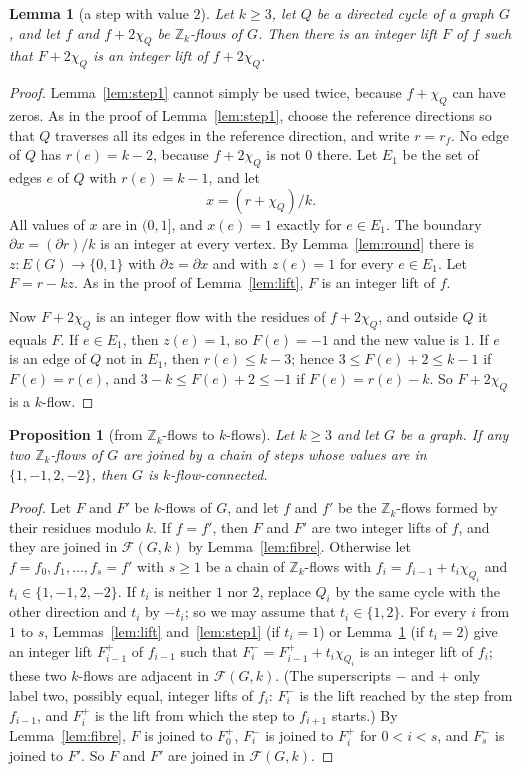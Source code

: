\documentclass[11pt]{article}
\newtheorem{lemma}[theorem]{Lemma}
\newtheorem{proposition}[theorem]{Proposition}
\theoremstyle{definition}
\newcommand{\Z}{\mathbb{Z}}
\newcommand{\cF}{\mathcal{F}}
\begin{document}
\begin{lemma}[a step with value $2$]\label{lem:step2}
Let $k\ge 3$, let $Q$ be a directed cycle of a graph $G$, and let $f$ and $f+2\chi_Q$ be $\Z_k$-flows of $G$. Then
there is an integer lift $F$ of $f$ such that $F+2\chi_Q$ is an integer lift of $f+2\chi_Q$.
\end{lemma}
\begin{proof}
Lemma~\ref{lem:step1} cannot simply be used twice, because $f+\chi_Q$ can have zeros. As in the proof of Lemma~\ref{lem:step1}, choose the reference directions so that $Q$ traverses all its edges in the reference
direction, and write $r=r_f$. No edge of $Q$ has $r(e)=k-2$, because $f+2\chi_Q$ is not $0$ there. Let $E_1$ be the set of edges $e$ of $Q$ with $r(e)=k-1$, and let
\[
x=(r+\chi_Q)/k .
\]
All values of $x$ are in $(0,1]$, and $x(e)=1$ exactly for $e\in E_1$. The boundary $\partial x=(\partial r)/k$ is
an integer at every vertex. By Lemma~\ref{lem:round} there is $z\colon E(G)\to\{0,1\}$ with $\partial z=\partial x$
and with $z(e)=1$ for every $e\in E_1$. Let $F=r-kz$. As in the proof of Lemma~\ref{lem:lift}, $F$ is an integer
lift of $f$.

Now $F+2\chi_Q$ is an integer flow with the residues of $f+2\chi_Q$, and outside $Q$ it equals $F$. If $e\in E_1$, then $z(e)=1$, so
$F(e)=-1$ and the new value is $1$. If $e$ is an edge of $Q$ not in $E_1$, then $r(e)\le k-3$; hence
$3\le F(e)+2\le k-1$ if $F(e)=r(e)$, and $3-k\le F(e)+2\le -1$ if $F(e)=r(e)-k$. So $F+2\chi_Q$ is a $k$-flow.
\end{proof}

\begin{proposition}[from $\Z_k$-flows to $k$-flows]\label{prop:transfer}
Let $k\ge 3$ and let $G$ be a graph. If any two $\Z_k$-flows of $G$ are joined by a chain of steps whose values are in
$\{1,-1,2,-2\}$, then $G$ is $k$-flow-connected.
\end{proposition}
\begin{proof}
Let $F$ and $F'$ be $k$-flows of $G$, and let $f$ and $f'$ be the $\Z_k$-flows formed by their residues modulo $k$. If $f=f'$, then $F$
and $F'$ are two integer lifts of $f$, and they are joined in $\cF(G,k)$ by Lemma~\ref{lem:fibre}. Otherwise let $f=f_0,f_1,\dots,f_s=f'$
with $s\ge 1$ be a chain of $\Z_k$-flows with $f_i=f_{i-1}+t_i\chi_{Q_i}$ and $t_i\in\{1,-1,2,-2\}$. If $t_i$ is
neither $1$ nor $2$, replace $Q_i$ by the same cycle with the other direction and $t_i$ by $-t_i$; so we may assume
that $t_i\in\{1,2\}$. For every $i$ from $1$ to $s$, Lemmas~\ref{lem:lift} and~\ref{lem:step1} (if $t_i=1$) or Lemma~\ref{lem:step2} (if
$t_i=2$) give an integer lift $F_{i-1}^{+}$ of $f_{i-1}$ such that $F_i^{-}=F_{i-1}^{+}+t_i\chi_{Q_i}$ is an integer
lift of $f_i$; these two $k$-flows are adjacent in $\cF(G,k)$. (The superscripts $-$ and $+$ only label two, possibly equal, integer lifts of $f_i$: $F_i^{-}$ is the lift reached by the step from $f_{i-1}$, and $F_i^{+}$ is the lift from which the step to $f_{i+1}$ starts.) By Lemma~\ref{lem:fibre}, $F$ is
joined to $F_0^{+}$, $F_i^{-}$ is joined to $F_i^{+}$ for $0<i<s$, and $F_s^{-}$ is joined to $F'$. So $F$ and $F'$
are joined in $\cF(G,k)$.
\end{proof}
\end{document}
